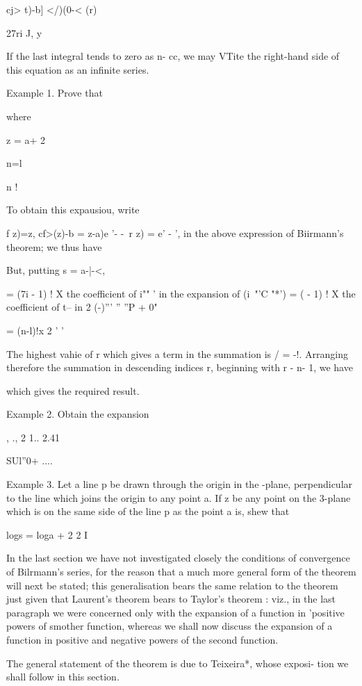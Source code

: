 cj> t)-b] </)(0-< (r)

27ri J, y

If the last integral tends to zero as n- cc, we may VTite the
right-hand side of this equation as an infinite series.

Example 1. Prove that

where

z = a+ 2

n=l

n !

To obtain this expausiou, write

f z)=z, cf>(z)-b = z-a)e '- -\ r z) = e' - ', in the above expression
of Biirmann's theorem; we thus have

But, putting s = a-|-<,

= (7i - 1) ! X the coefficient of i"" ' in the expansion of (i~"'C
"*') = ( - 1) ! X the coefficient of t-- in 2 (-)''' '' ''P + 0"

= (n-l)!x 2 ' '

The highest vahie of r which gives a term in the summation is / = -!.
Arranging therefore the summation in descending indices r, beginning
with r - n- 1, we have

which gives the required result.

Example 2. Obtain the expansion

, ., 2 1.. 2.41

SUl''0+ ....

%
%

Example 3. Let a line p be drawn through the origin in the -plane,
perpendicular to the line which joins the origin to any point a. If z
be any point on the 3-plane which is on the same side of the line p as
the point a is, shew that

logs = loga + 2 2 I


In the last section we have not investigated closely the conditions of
convergence of Bilrmann's series, for the reason that a much more
general form of the theorem will next be stated; this generalisation
bears the same relation to the theorem just given that Laurent's
theorem bears to Taylor's theorem : viz., in the last paragraph we
were concerned only with the expansion of a function in 'positive
powers of smother function, whereas we shall now discuss the expansion
of a function in positive and negative powers of the second function.

The general statement of the theorem is due to Teixeira*, whose
exposi- tion we shall follow in this section.

